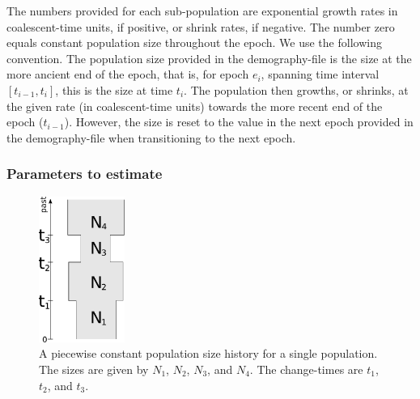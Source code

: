 \documentclass{article}
\numberwithin{equation}{section}
\begin{document}
The numbers provided for each sub-population are exponential growth rates in coalescent-time units, if positive, or shrink rates, if negative. The number zero equals constant population size throughout the epoch. We use the following convention. The population size provided in the demography-file is the size at the more ancient end of the epoch, that is, for epoch $e_i$, spanning time interval $[t_{i-1},t_i]$, this is the size at time $t_i$. The population then growths, or shrinks, at the given rate (in coalescent-time units) towards the more recent end of the epoch ($t_{i-1}$). However, the size is reset to the value in the next epoch provided in the demography-file when transitioning to the next epoch.

\subsubsection{Parameters to estimate}

\begin{figure}
  \begin{center}
    \includegraphics[width=0.25\textwidth]{graphics/piecewiseConst.pdf}
  \end{center} 
  \caption{A piecewise constant population size history for a single population. The sizes are given by $N_1$, $N_2$, $N_3$, and $N_4$. The change-times are $t_1$, $t_2$, and $t_3$.}
  \label{fig_piecewise_const}
\end{figure}
\end{document}
